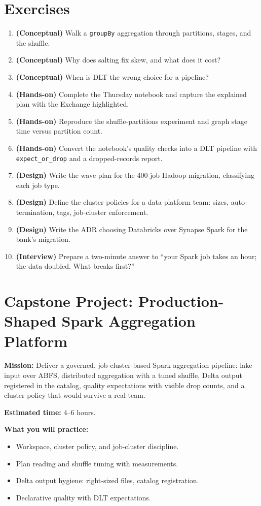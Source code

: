 \section{Exercises}
\begin{enumerate}
    \item \textbf{(Conceptual)} Walk a \texttt{groupBy} aggregation through partitions, stages, and the shuffle.
    \item \textbf{(Conceptual)} Why does salting fix skew, and what does it cost?
    \item \textbf{(Conceptual)} When is DLT the wrong choice for a pipeline?
    \item \textbf{(Hands-on)} Complete the Thursday notebook and capture the explained plan with the Exchange highlighted.
    \item \textbf{(Hands-on)} Reproduce the shuffle-partitions experiment and graph stage time versus partition count.
    \item \textbf{(Hands-on)} Convert the notebook's quality checks into a DLT pipeline with \texttt{expect\_or\_drop} and a dropped-records report.
    \item \textbf{(Design)} Write the wave plan for the 400-job Hadoop migration, classifying each job type.
    \item \textbf{(Design)} Define the cluster policies for a data platform team: sizes, auto-termination, tags, job-cluster enforcement.
    \item \textbf{(Design)} Write the ADR choosing Databricks over Synapse Spark for the bank's migration.
    \item \textbf{(Interview)} Prepare a two-minute answer to ``your Spark job takes an hour; the data doubled. What breaks first?''
\end{enumerate}

\section{Capstone Project: Production-Shaped Spark Aggregation Platform}\label{sec:ch9-capstone}

\begin{capstonebox}
\textbf{Mission:} Deliver a governed, job-cluster-based Spark aggregation pipeline: lake input over ABFS, distributed aggregation with a tuned shuffle, Delta output registered in the catalog, quality expectations with visible drop counts, and a cluster policy that would survive a real team.

\textbf{Estimated time:} 4--6 hours.

\textbf{What you will practice:}
\begin{itemize}
    \item Workspace, cluster policy, and job-cluster discipline.
    \item Plan reading and shuffle tuning with measurements.
    \item Delta output hygiene: right-sized files, catalog registration.
    \item Declarative quality with DLT expectations.
\end{itemize}
\end{capstonebox}

